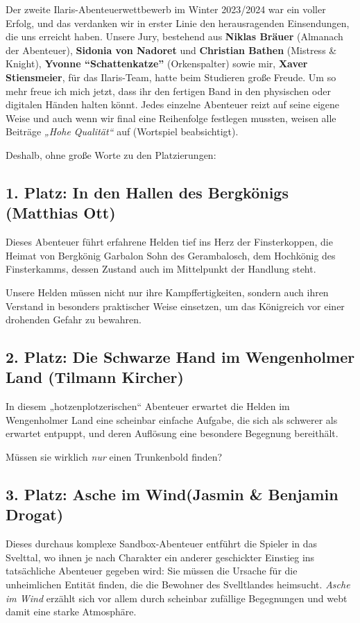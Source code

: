 Der zweite Ilaris-Abenteuerwettbewerb im Winter 2023/2024 war ein voller Erfolg, und das verdanken wir in erster Linie den herausragenden Einsendungen, die uns erreicht haben.
Unsere Jury, bestehend aus \textbf{Niklas Bräuer} (Almanach der Abenteuer), \textbf{Sidonia von Nadoret} und \textbf{Christian Bathen} (Mistress \& Knight), \textbf{Yvonne \enquote{Schattenkatze}} (Orkenspalter) sowie mir, \textbf{Xaver Stiensmeier}, für das Ilaris-Team, hatte beim Studieren große Freude.
Um so mehr freue ich mich jetzt, dass ihr den fertigen Band in den physischen oder digitalen Händen halten könnt. Jedes einzelne Abenteuer reizt auf seine eigene Weise und auch wenn wir final eine Reihenfolge festlegen mussten, weisen alle Beiträge \textit{„Hohe Qualität“} auf (Wortspiel beabsichtigt).

Deshalb, ohne große Worte zu den Platzierungen:

\subsection*{1. Platz: In den Hallen des Bergkönigs (Matthias Ott)}
Dieses Abenteuer führt erfahrene Helden tief ins Herz der Finsterkoppen, die Heimat von Bergkönig Garbalon Sohn des Gerambalosch, dem Hochkönig des Finsterkamms, dessen Zustand auch im Mittelpunkt der Handlung steht.

Unsere Helden müssen nicht nur ihre Kampffertigkeiten, sondern auch ihren Verstand in besonders praktischer Weise einsetzen, um das Königreich vor einer drohenden Gefahr zu bewahren.
\subsection*{2. Platz: Die Schwarze Hand im Wen\-gen\-holmer Land (Tilmann Kircher)}
In diesem „hotzenplotzerischen“ Abenteuer erwartet die Helden im Wengenholmer Land eine scheinbar einfache Aufgabe, die sich als schwerer als erwartet entpuppt, und deren Auflösung eine besondere Begegnung bereithält.

Müssen sie wirklich \textit{nur} einen Trunkenbold finden?
\subsection*{3. Platz: Asche im Wind\newline (Jasmin \& Benjamin Drogat)}
Dieses durchaus komplexe Sandbox-Abenteuer entführt die Spieler in das Svelttal, wo ihnen je nach Charakter ein anderer geschickter Einstieg ins tatsächliche Abenteuer gegeben wird: Sie müssen die Ursache für die unheimlichen Entität finden, die die Bewohner des Svelltlandes heimsucht. \textit{Asche im Wind} erzählt sich vor allem durch scheinbar zufällige Begegnungen und webt damit eine starke Atmosphäre. 

